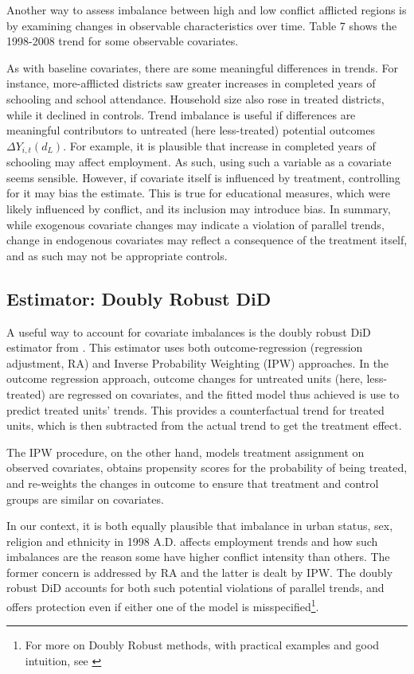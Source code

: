 \documentclass[12pt,a4paper]{article}
\begin{document}
Another way to assess imbalance between high and low conflict afflicted regions is by examining changes in observable characteristics over time. Table 7 shows the 1998-2008 trend for some observable covariates. 




As with baseline covariates, there are some meaningful differences in trends. For instance, more-afflicted districts saw greater increases in completed years of schooling and school attendance. Household size also rose in treated districts, while it declined in controls. Trend imbalance is useful if differences are meaningful contributors to untreated (here less-treated) potential outcomes $\Delta Y_{i,t}(d_{L})$. For example, it is plausible that increase in completed years of schooling may affect employment. As such, using such a variable as a covariate seems sensible. However, if covariate itself is influenced by treatment, controlling for it may bias the estimate. This is true for educational measures, which were likely influenced by conflict, and its inclusion may introduce bias. In summary, while exogenous covariate changes may indicate a violation of parallel trends, change in endogenous covariates may reflect a consequence of the treatment itself, and as such may not be appropriate controls.


\subsection{Estimator: Doubly Robust DiD}

A useful way to account for covariate imbalances is the doubly robust DiD estimator from \parencite{sant2020doubly}. This estimator uses both outcome-regression (regression adjustment, RA) and Inverse Probability Weighting (IPW) approaches. In the outcome regression approach, outcome changes for untreated units (here, less-treated) are regressed on covariates, and the fitted model thus achieved is use to predict treated units' trends. This provides a counterfactual trend for treated units, which is then subtracted from the actual trend to get the treatment effect. 

The IPW procedure, on the other hand, models treatment assignment on observed covariates, obtains propensity scores for the probability of being treated, and re-weights the changes in outcome to ensure that treatment and control groups are similar on covariates.

In our context, it is both equally plausible that imbalance in urban status, sex, religion and ethnicity in 1998 A.D. affects employment trends and how such imbalances are the reason some have higher conflict intensity than others. The former concern is addressed by RA and the latter is dealt by IPW. The doubly robust DiD accounts for both such potential violations of parallel trends, and offers protection even if either one of the model is misspecified\footnote{For more on Doubly Robust methods, with practical examples and good intuition, see \textcite{baker2025difference}}.
\end{document}
